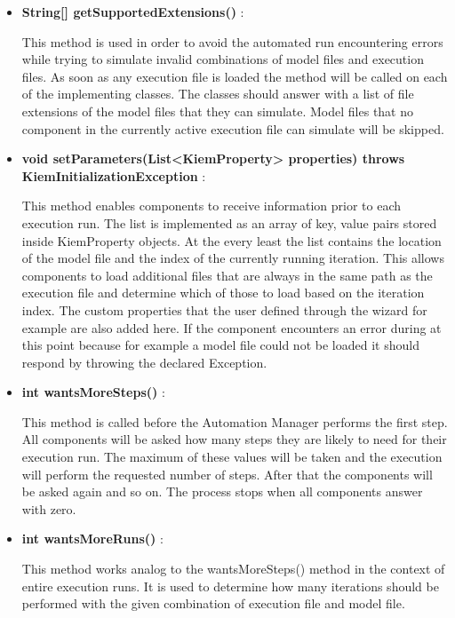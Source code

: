 \begin{itemize}
 \item \textbf{String[] getSupportedExtensions()} :

This method is used in order to avoid the automated run encountering errors while trying to
simulate invalid combinations of model files and execution files. As soon as any execution file
is loaded the method will be called on each of the implementing classes. The classes should answer
with a list of file extensions of the model files that they can simulate. Model files that no
component in the currently active execution file can simulate will be skipped.

 \item \textbf{void setParameters(List<KiemProperty> properties) throws KiemInitializationException} : 

This method enables components to receive information prior to each execution
run. The list is implemented as an array of key, value pairs stored inside
KiemProperty objects.
At the every least the list contains the location of the model file and the
index of the currently running iteration.
This allows components to load additional files that are always in the
same path as the execution file and determine which of those to load
based on the iteration index.
The custom properties that the user defined through the wizard for example are
also added here.
If the component encounters an error during at this point because for example a model file
could not be loaded it should respond by throwing the declared Exception.

 \item \textbf{int wantsMoreSteps()} : 

This method is called before the Automation Manager performs the first step.
All components will be asked how many steps they are likely to need for their
execution run. The maximum of these values will be taken and the execution
will perform the requested number of steps. After that the components
will be asked again and so on. The process stops when all components
answer with zero.

 \item \textbf{int wantsMoreRuns()} : 

This method works analog to the wantsMoreSteps() method in the context
of entire execution runs. It is used to determine how many iterations
should be performed with the given combination of execution file and model
file.
\end{itemize}


